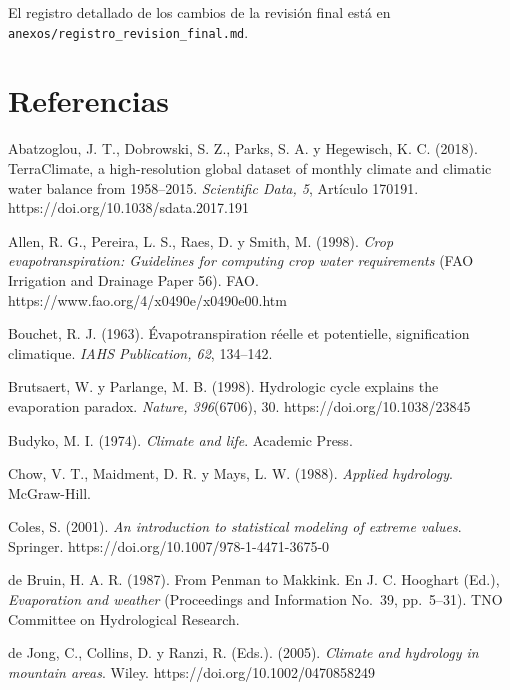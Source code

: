 \documentclass[12pt,a4paper]{article}
\begin{document}
El registro detallado de los cambios de la revisión final está en \texttt{anexos/registro\_revision\_final.md}.

\newpage
\section*{Referencias}
\begingroup
\setlength{\parindent}{-1.27cm}\setlength{\leftskip}{1.27cm}\setlength{\parskip}{6pt}\raggedright
\newcommand{\refx}[2]{\par\noindent\hspace*{-1.27cm}\hypertarget{#1}{}#2}

\refx{abatzoglou2018}{Abatzoglou, J. T., Dobrowski, S. Z., Parks, S. A. y Hegewisch, K. C. (2018). TerraClimate, a high-resolution global dataset of monthly climate and climatic water balance from 1958--2015. \textit{Scientific Data, 5}, Artículo 170191. https://doi.org/10.1038/sdata.2017.191}

\refx{allen1998}{Allen, R. G., Pereira, L. S., Raes, D. y Smith, M. (1998). \textit{Crop evapotranspiration: Guidelines for computing crop water requirements} (FAO Irrigation and Drainage Paper 56). FAO. https://www.fao.org/4/x0490e/x0490e00.htm}

\refx{bouchet1963}{Bouchet, R. J. (1963). Évapotranspiration réelle et potentielle, signification climatique. \textit{IAHS Publication, 62}, 134--142.}

\refx{brutsaert1998}{Brutsaert, W. y Parlange, M. B. (1998). Hydrologic cycle explains the evaporation paradox. \textit{Nature, 396}(6706), 30. https://doi.org/10.1038/23845}

\refx{budyko1974}{Budyko, M. I. (1974). \textit{Climate and life}. Academic Press.}

\refx{chow1988}{Chow, V. T., Maidment, D. R. y Mays, L. W. (1988). \textit{Applied hydrology}. McGraw-Hill.}

\refx{coles2001}{Coles, S. (2001). \textit{An introduction to statistical modeling of extreme values}. Springer. https://doi.org/10.1007/978-1-4471-3675-0}

\refx{debruin1987}{de Bruin, H. A. R. (1987). From Penman to Makkink. En J. C. Hooghart (Ed.), \textit{Evaporation and weather} (Proceedings and Information No.~39, pp.~5--31). TNO Committee on Hydrological Research.}

\refx{dejong2005}{de Jong, C., Collins, D. y Ranzi, R. (Eds.). (2005). \textit{Climate and hydrology in mountain areas}. Wiley. https://doi.org/10.1002/0470858249}
\end{document}
